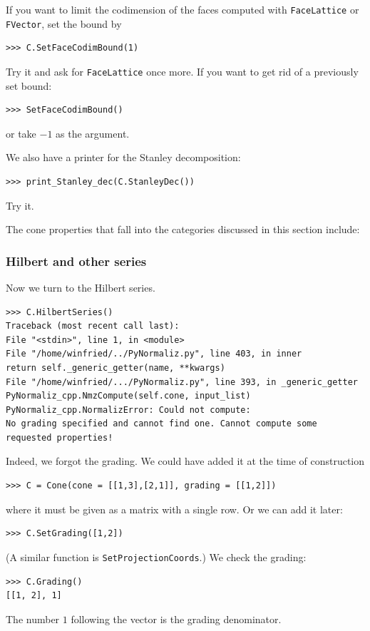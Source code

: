 \begin{small}
If you want to limit the codimension of the faces computed with \verb|FaceLattice| or \verb|FVector|, set the bound by
\begin{Verbatim}
>>> C.SetFaceCodimBound(1)
\end{Verbatim}
Try it and ask for \verb|FaceLattice| once more. If you want to get rid of a previously set bound:
\begin{Verbatim}
>>> SetFaceCodimBound()
\end{Verbatim}
or take $-1$ as the argument.

We also have a printer for the Stanley decomposition:
\begin{Verbatim}
>>> print_Stanley_dec(C.StanleyDec())
\end{Verbatim}
Try it.

The cone properties that fall into the categories discussed in this section include: 

\subsubsection{Hilbert and other series}

Now we turn to the Hilbert series.
\begin{Verbatim}
>>> C.HilbertSeries()
Traceback (most recent call last):
File "<stdin>", line 1, in <module>
File "/home/winfried/../PyNormaliz.py", line 403, in inner
return self._generic_getter(name, **kwargs)
File "/home/winfried/.../PyNormaliz.py", line 393, in _generic_getter
PyNormaliz_cpp.NmzCompute(self.cone, input_list)
PyNormaliz_cpp.NormalizError: Could not compute: 
No grading specified and cannot find one. Cannot compute some requested properties!
\end{Verbatim}
Indeed, we forgot the grading. We could have added it at the time of construction
\begin{Verbatim}
>>> C = Cone(cone = [[1,3],[2,1]], grading = [[1,2]])
\end{Verbatim}
where it must be given as a matrix with a single row. Or we can add it later:
\begin{Verbatim}
>>> C.SetGrading([1,2])
\end{Verbatim}
(A similar function is \verb|SetProjectionCoords|.) We check the grading:
\begin{Verbatim}
>>> C.Grading()
[[1, 2], 1]
\end{Verbatim}
The number $1$ following the vector is the grading denominator.


\end{small}
